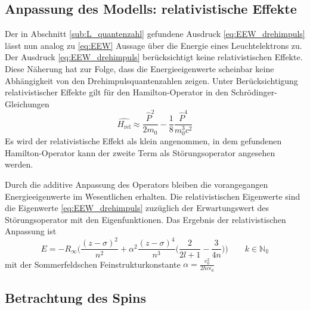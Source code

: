 
\subsection{Anpassung des Modells: relativistische Effekte} %
\label{sub:rel}
Der in Abschnitt \ref{sub:L_quantenzahl} gefundene Ausdruck \eqref{eq:EEW_drehimpuls} lässt nun analog zu \eqref{eq:EEW} Aussage über die Energie eines Leuchtelektrons zu.
Der Ausdruck \eqref{eq:EEW_drehimpuls} berücksichtigt keine relativistischen Effekte.
Diese Näherung hat zur Folge, dass die Energieeigenwerte scheinbar keine Abhängigkeit von den Drehimpulsquantenzahlen zeigen.
Unter Berücksichtigung relativistischer Effekte gilt für den Hamilton-Operator in den Schrödinger-Gleichungen
\begin{equation}
	\hat{H_\text{rel}}\approx\frac{\hat{P}^2}{2m_0}-\frac{1}{8}\frac{\hat{P}^4}{m_0^3 c^2}
	\label{eq:relativerhamilton}
\end{equation}
Es wird der relativistische Effekt als klein angenommen, in dem gefundenen Hamilton-Operator kann der zweite Term als Störungsoperator angesehen werden.

Durch die additive Anpassung des Operators bleiben die vorangegangen Energieeigenwerte im Wesentlichen erhalten.
Die relativistischen Eigenwerte sind die Eigenwerte \eqref{eq:EEW_drehimpuls} zuzüglich der Erwartungswert des Störungsoperator mit den Eigenfunktionen.
Das Ergebnis der relativistischen Anpassung ist
\begin{equation}
	E=-R_\infty\biggl(\frac{(z-\sigma)^2}{n^2}+\alpha^2\frac{(z-\sigma)^4}{n^3}\biggl(\frac{2}{2l+1}-\frac{3}{4n}\biggr) \biggr)\qquad k\in\mathbb{N_0}
	\label{eq:EEW_rel}
\end{equation}
mit der Sommerfeldschen Feinstrukturkonstante $\alpha=\frac{e_0^2}{2hc\epsilon_0}$

\subsection{Betrachtung des Spins} %
\label{sub:spin}

